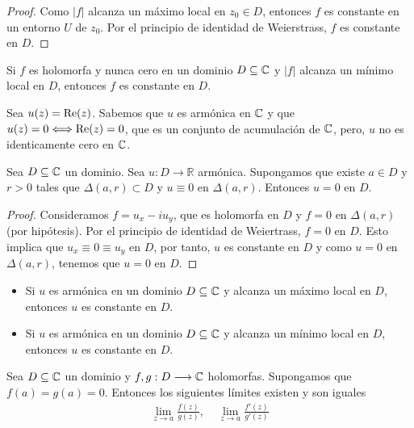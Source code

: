\begin{proof}
    Como $|f|$ alcanza un máximo local en $z_0 \in D$, entonces $f$ es constante en un entorno $U$ de $z_0$. Por el principio de identidad de Weierstrass, $f$ es constante en $D$.
\end{proof}

\begin{teo}
    Si $f$ es holomorfa y nunca cero en un dominio $D \subseteq \mathbb{C}$ y $|f|$ alcanza un mínimo local en $D$, entonces $f$ es constante en $D$.
\end{teo}

\begin{ejemplo}
    Sea $u(z) = \text{Re}(z)$. Sabemos que $u$ es armónica en $\mathbb{C}$ y que $u(z) = 0 \Longleftrightarrow \text{Re}(z) = 0$, que es un conjunto de acumulación de $\mathbb{C}$, pero, $u$ no es identicamente cero en $\mathbb{C}$.
\end{ejemplo}

\begin{teo}
    Sea $D \subseteq \mathbb{C}$ un dominio. Sea $u: D \longrightarrow \mathbb{R}$ armónica. Supongamos que existe $a \in D$ y $r > 0$ tales que $\Delta(a,r) \subset D$ y $u \equiv 0$ en $\Delta(a,r)$. Entonces $u = 0$ en $D$.
\end{teo}

\begin{proof}
    Consideramos $f = u_x - iu_y$, que es holomorfa en $D$ y $f = 0$ en $\Delta(a,r)$ (por hipótesis). Por el principio de identidad de Weiertrass, $f = 0$ en $D$. Esto implica que $u_x \equiv 0 \equiv u_y$ en $D$, por tanto, $u$ es constante en $D$ y como $u = 0$ en $\Delta(a,r)$, tenemos que $u = 0$ en $D$.
\end{proof}

\begin{teo}
    \begin{itemize}
        \item Si $u$ es armónica en un dominio $D \subseteq \mathbb{C}$ y alcanza un máximo local en $D$, entonces $u$ es constante en $D$.
        \item Si $u$ es armónica en un dominio $D \subseteq \mathbb{C}$ y alcanza un mínimo local en $D$, entonces $u$ es constante en $D$.
    \end{itemize}
\end{teo}

\begin{teo}
    Sea $D \subseteq \mathbb{C}$ un dominio y $f,g: D \longrightarrow \mathbb{C}$ holomorfas. Supongamos que $f(a) = g(a) = 0$. Entonces los siguientes límites existen y son iguales
    \begin{align*}
        \lim_{z \to a}{\frac{f(z)}{g(z)}}, \ \ \ \ \ \lim_{z \to a}{\frac{f'(z)}{g'(z)}}
    \end{align*}
\end{teo}

